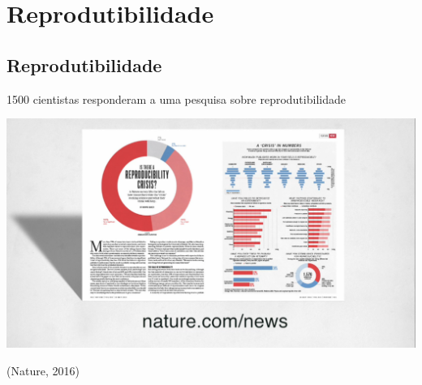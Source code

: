 \documentclass{beamer}
\begin{document}
\section{Reprodutibilidade}
\subsection{Reprodutibilidade}


\begin{frame}
  1500 cientistas responderam a uma pesquisa sobre reprodutibilidade

\includegraphics[width=\textwidth]{Intro/reprod-nature3}

  \vfill
  \begin{center}
    (Nature, 2016)
  \end{center}
\end{frame}
\end{document}
